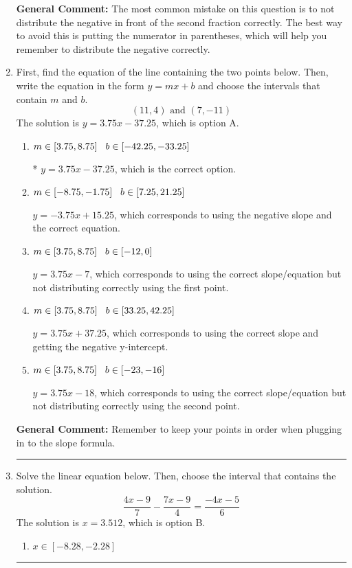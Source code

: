 \documentclass{extbook}[14pt]
\newcommand{\litem}[1]{\item #1

\rule{\textwidth}{0.4pt}}
\begin{document}
\begin{enumerate}
{\textbf{General Comment:} The most common mistake on this question is to not distribute the negative in front of the second fraction correctly. The best way to avoid this is putting the numerator in parentheses, which will help you remember to distribute the negative correctly.
}
\litem{
First, find the equation of the line containing the two points below. Then, write the equation in the form $ y=mx+b $ and choose the intervals that contain $m$ and $b$.
\[ (11, 4) \text{ and } (7, -11) \]The solution is \( y = 3.75x -37.25 \), which is option A.\begin{enumerate}[label=\Alph*.]
\item \( m \in [3.75, 8.75] \hspace*{3mm} b \in [-42.25, -33.25] \)

* $y = 3.75x -37.25$, which is the correct option.
\item \( m \in [-8.75, -1.75] \hspace*{3mm} b \in [7.25, 21.25] \)

 $y = -3.75x + 15.25$, which corresponds to using the negative slope and the correct equation.
\item \( m \in [3.75, 8.75] \hspace*{3mm} b \in [-12, 0] \)

 $y = 3.75x -7$, which corresponds to using the correct slope/equation but not distributing correctly using the first point.
\item \( m \in [3.75, 8.75] \hspace*{3mm} b \in [33.25, 42.25] \)

 $y = 3.75x + 37.25$, which corresponds to using the correct slope and getting the negative y-intercept.
\item \( m \in [3.75, 8.75] \hspace*{3mm} b \in [-23, -16] \)

 $y = 3.75x -18$, which corresponds to using the correct slope/equation but not distributing correctly using the second point.
\end{enumerate}

\textbf{General Comment:} Remember to keep your points in order when plugging in to the slope formula.
}
\litem{
Solve the linear equation below. Then, choose the interval that contains the solution.
\[ \frac{4x -9}{7} - \frac{7x -9}{4} = \frac{-4x -5}{6} \]The solution is \( x = 3.512 \), which is option B.\begin{enumerate}[label=\Alph*.]
\item \( x \in [-8.28, -2.28] \)


\end{enumerate}}
\end{enumerate}
\end{document}
